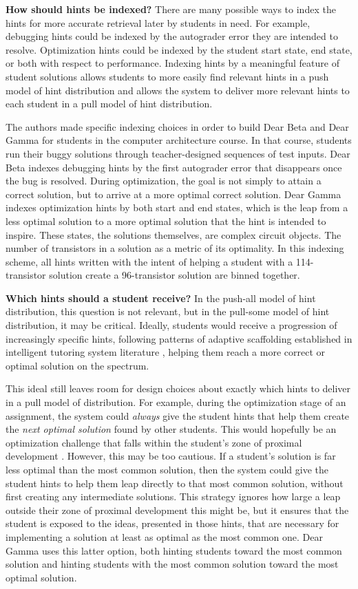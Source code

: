 {\bf How should hints be indexed?} There are many possible ways to index the hints for more accurate retrieval later by students in need. For example, debugging hints could be indexed by the autograder error they are intended to resolve. Optimization hints could be indexed by the student start state, end state, or both with respect to performance. Indexing hints by a meaningful feature of student solutions allows students to more easily find relevant hints in a push model of hint distribution and allows the system to deliver more relevant hints to each student in a pull model of hint distribution. 

The authors made specific indexing choices in order to build Dear Beta and Dear Gamma for students in the computer architecture course. In that course, students run their buggy solutions through teacher-designed sequences of test inputs. Dear Beta indexes debugging hints by the first autograder error that disappears once the bug is resolved. During optimization, the goal is not simply to attain a correct solution, but to arrive at a more optimal correct solution. Dear Gamma indexes optimization hints by both start and end states, which is the leap from a less optimal solution to a more optimal solution that the hint is intended to inspire. These states, the solutions themselves, are complex circuit objects. The number of transistors in a solution as a metric of its optimality. In this indexing scheme, all hints written with the intent of helping a student with a 114-transistor solution create a 96-transistor solution are binned together.

{\bf Which hints should a student receive?} In the push-all model of hint distribution, this question is not relevant, but in the pull-some model of hint distribution, it may be critical. Ideally, students would receive a progression of increasingly specific hints, following patterns of adaptive scaffolding established in intelligent tutoring system literature \cite{andes}, helping them reach a more correct or optimal solution on the spectrum. 

This ideal still leaves room for design choices about exactly which hints to deliver in a pull model of distribution. For example, during the optimization stage of an assignment, the system could \textit{always} give the student hints that help them create the \textit{next optimal solution} found by other students. This would hopefully be an optimization challenge that falls within the student's zone of proximal development \cite{ZMP}. However, this may be too cautious. If a student's solution is far less optimal than the most common solution, then the system could give the student hints to help them leap directly to that most common solution, without first creating any intermediate solutions. This strategy ignores how large a leap outside their zone of proximal development this might be, but it ensures that the student is exposed to the ideas, presented in those hints, that are necessary for implementing a solution at least as optimal as the most common one. Dear Gamma uses this latter option, both hinting students toward the most common solution and hinting students with the most common solution toward the most optimal solution.

